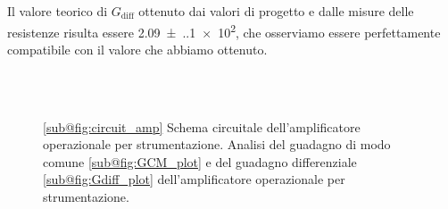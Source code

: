\documentclass[
    prl,
    reprint, 
    superscriptaddress, 
    altaffilletter, 
    amsmath, 
    amssymb, 
    a4paper,
    varvw]{revtex4-2}
\begin{document}
Il valore teorico di $G_\text{diff}$ ottenuto dai valori di progetto e dalle misure delle resistenze risulta essere \num{2.09(.10)e2}, che osserviamo essere perfettamente compatibile con il valore che abbiamo ottenuto. 

\begin{figure}
    \centering
    \\
    \\

    \caption{
        \ref{sub@fig:circuit_amp} Schema circuitale dell'amplificatore operazionale per strumentazione.
        Analisi del guadagno di modo comune \ref{sub@fig:GCM_plot} e del guadagno differenziale \ref{sub@fig:Gdiff_plot} dell'amplificatore operazionale per strumentazione. 
    }
\end{figure}

\setcounter{table}{0}
\renewcommand{\thetable}{A-\Roman{table}}

%

\end{document}
